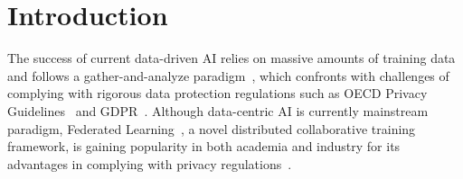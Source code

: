 \section{Introduction}
\label{sec:intro}

The success of current data-driven AI relies on massive amounts of training data and follows a gather-and-analyze paradigm~\cite{whang2023data}, which confronts with challenges of complying with rigorous data protection regulations such as OECD Privacy Guidelines~\cite{tene2011privacy} and GDPR~\cite{voigt2017eu}.
Although data-centric AI is currently mainstream paradigm, Federated Learning~\cite{li2020federated}, a novel distributed collaborative training framework, is gaining popularity in both academia and industry for its advantages in complying with privacy regulations~\cite{truong2021privacy}.

